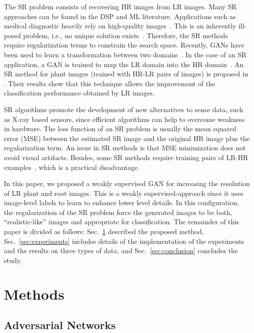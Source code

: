 \documentclass[10pt,twocolumn,letterpaper]{article}
\begin{document}
The SR problem consists of recovering HR images from LR images. Many SR approaches can be found in the DSP and ML literature. Applications such as medical diagnostic heavily rely on high-quality images~\cite{Zhang2012}. This is an inherently ill-posed problem, i.e., no unique solution exists~\cite{Hui2018}. Therefore, the SR methods require regularization terms to constrain the search space. 
Recently, GANs have been used to learn a transformation between two domains~\cite{Hong2018}. In the case of an SR application, a GAN is trained to map the LR domain into the HR domain~\cite{Ledig2017}. An SR method for plant images (trained with HR-LR pairs of images) is proposed in \cite{Yamamoto2017}. Their results show that this technique allows the improvement of the classification performance obtained by LR images.

SR algorithms promote the development of new alternatives to sense data, such as X-ray based sensors, since efficient algorithms can help to overcome weakness in hardware. The loss function of an SR problem is usually the mean squared error (MSE) between the estimated SR image and the original HR image plus the regularization term. An issue in SR methods is that MSE minimization does not avoid visual artifacts. Besides, some SR methods require training pairs of LR-HR examples~\cite{Zeyde2012}, which is a practical disadvantage.

In this paper, we proposed a weakly supervised GAN for increasing the resolution of LR plant and root images. This is a weakly supervised-approach since it uses image-level labels to learn to enhance lower level details. In this configuration, the regularization of the SR problem force the generated images to be both, ``realistic-like'' images and appropriate for classification. The remainder of this paper is divided as follows: Sec.~\ref{sec:methods} described the proposed method, Sec.~\ref{sec:experiments} includes details of the implementation of the experiments and the results on three types of data, and Sec.~\ref{sec:conclusion} concludes the study.


\section{Methods}
\label{sec:methods}

\subsection{Adversarial Networks}
\end{document}

